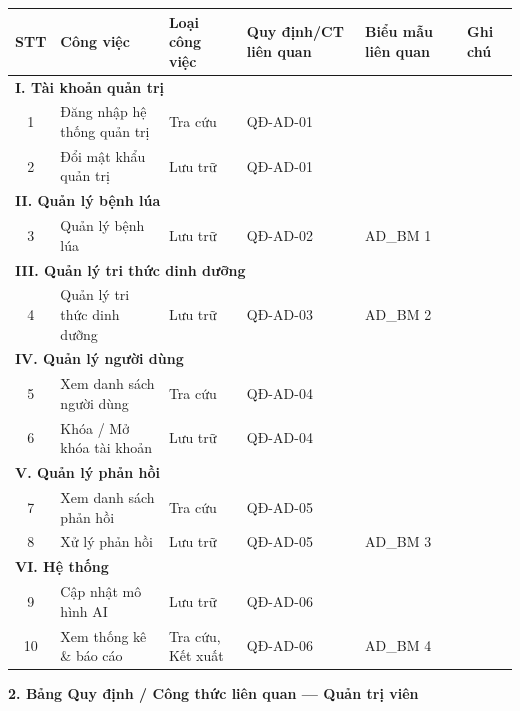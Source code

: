 ﻿\documentclass[12pt,a4paper]{article}
\begin{document}
\begin{longtable}{|c|p{3cm}|p{2cm}|p{2.5cm}|p{2cm}|p{2.5cm}|}
\hline
\rowcolor{headerblue}
\textbf{STT} & \textbf{Công việc} & \textbf{Loại công việc} & \textbf{Quy định/CT liên quan} & \textbf{Biểu mẫu liên quan} & \textbf{Ghi chú} \\
\hline
\endhead
\multicolumn{6}{|l|}{\cellcolor{notegreen}\textbf{I. Tài khoản quản trị}} \\
\hline
1 & Đăng nhập hệ thống quản trị & Tra cứu & QĐ-AD-01 & & \\
\hline
2 & Đổi mật khẩu quản trị & Lưu trữ & QĐ-AD-01 & & \\
\hline
\multicolumn{6}{|l|}{\cellcolor{notegreen}\textbf{II. Quản lý bệnh lúa}} \\
\hline
3 & Quản lý bệnh lúa & Lưu trữ & QĐ-AD-02 & AD\_BM 1 & \\
\hline
\multicolumn{6}{|l|}{\cellcolor{notegreen}\textbf{III. Quản lý tri thức dinh dưỡng}} \\
\hline
4 & Quản lý tri thức dinh dưỡng & Lưu trữ & QĐ-AD-03 & AD\_BM 2 & \\
\hline
\multicolumn{6}{|l|}{\cellcolor{notegreen}\textbf{IV. Quản lý người dùng}} \\
\hline
5 & Xem danh sách người dùng & Tra cứu & QĐ-AD-04 & & \\
\hline
6 & Khóa / Mở khóa tài khoản & Lưu trữ & QĐ-AD-04 & & \\
\hline
\multicolumn{6}{|l|}{\cellcolor{notegreen}\textbf{V. Quản lý phản hồi}} \\
\hline
7 & Xem danh sách phản hồi & Tra cứu & QĐ-AD-05 & & \\
\hline
8 & Xử lý phản hồi & Lưu trữ & QĐ-AD-05 & AD\_BM 3 & \\
\hline
\multicolumn{6}{|l|}{\cellcolor{notegreen}\textbf{VI. Hệ thống}} \\
\hline
9 & Cập nhật mô hình AI & Lưu trữ & QĐ-AD-06 & & \\
\hline
10 & Xem thống kê \& báo cáo & Tra cứu, Kết xuất & QĐ-AD-06 & AD\_BM 4 & \\
\hline
\end{longtable}

\vspace{0.3cm}
\textbf{2. Bảng Quy định / Công thức liên quan --- Quản trị viên}
\end{document}
